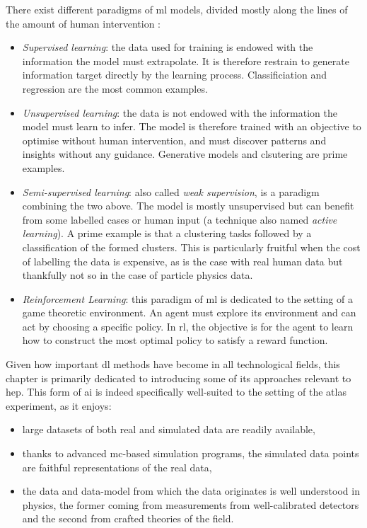 There exist different paradigms of \gls{ml} models, divided mostly along the lines of the amount of human intervention \cite{MurphyML}:
\begin{itemize}
    \item \textit{Supervised learning}: the data used for training is endowed with the information the model must extrapolate. It is therefore restrain to generate information target directly by the learning process. Classificiation and regression are the most common examples.
    \item \textit{Unsupervised learning}: the data is not endowed with the information the model must learn to infer. The model is therefore trained with an objective to optimise without human intervention, and must discover patterns and insights without any guidance. Generative models and clsutering are prime examples.
    \item \textit{Semi-supervised learning}: also called \textit{weak supervision}, is a paradigm combining the two above. The model is mostly unsupervised but can benefit from some labelled cases or human input (a technique also named \textit{active learning}). A prime example is that a clustering tasks followed by a classification of the formed clusters. This is particularly fruitful when the cost of labelling the data is expensive, as is the case with real human data but thankfully not so in the case of particle physics data.
    \item\textit{Reinforcement Learning}: this paradigm of \gls{ml} is dedicated to the setting of a game theoretic environment. An agent must explore its environment and can act by choosing a specific policy. In \gls{rl}, the objective is for the agent to learn how to construct the most optimal policy to satisfy a reward function.
\end{itemize}

Given how important \gls{dl} methods have become in all technological fields, this chapter is primarily dedicated to introducing some of its approaches relevant to \gls{hep}. This form of \gls{ai} is indeed specifically well-suited to the setting of the \gls{atlas} experiment, as it enjoys:
\begin{itemize}
    \item large datasets of both real and simulated data are readily available,
    \item thanks to advanced \gls{mc}-based simulation programs, the simulated data points are faithful representations of the real data,
    \item the data and data-model from which the data originates is well understood in physics, the former coming from measurements from well-calibrated detectors and the second from crafted theories of the field. 
\end{itemize}


